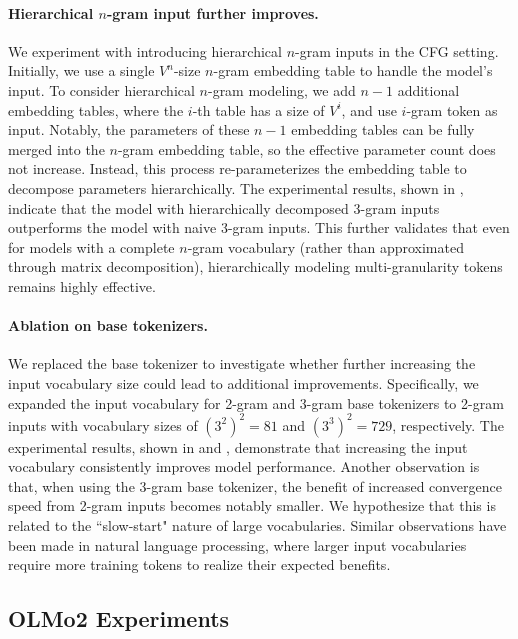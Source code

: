 \paragraph{Hierarchical $n$-gram input further improves.} 
We experiment with introducing hierarchical $n$-gram inputs in the CFG setting. Initially, we use a single $V^n$-size $n$-gram embedding table to handle the model's input. To consider hierarchical $n$-gram modeling, we add $n-1$ additional embedding tables, where the $i$-th table has a size of $V^i$, and use $i$-gram token as input. Notably, the parameters of these $n-1$ embedding tables can be fully merged into the $n$-gram embedding table, so the effective parameter count does not increase. Instead, this process re-parameterizes the embedding table to decompose parameters hierarchically. 
The experimental results, shown in , indicate that the model with hierarchically decomposed 3-gram inputs outperforms the model with naive 3-gram inputs. This further validates that even for models with a complete $n$-gram vocabulary (rather than approximated through matrix decomposition), hierarchically modeling multi-granularity tokens remains highly effective.

\paragraph{Ablation on base tokenizers. } We replaced the base tokenizer to investigate whether further increasing the input vocabulary size could lead to additional improvements. Specifically, we expanded the input vocabulary for 2-gram and 3-gram base tokenizers to 2-gram inputs with vocabulary sizes of $(3^2)^2 = 81$ and $(3^3)^2 = 729$, respectively. The experimental results, shown in  and , demonstrate that increasing the input vocabulary consistently improves model performance. 
Another observation is that, when using the 3-gram base tokenizer, the benefit of increased convergence speed from 2-gram inputs becomes notably smaller. We hypothesize that this is related to the ``slow-start" nature of large vocabularies. Similar observations have been made in natural language processing, where larger input vocabularies require more training tokens to realize their expected benefits.

\subsection{OLMo2 Experiments}
\label{sec:appendix_detailed_olom2_exps}

